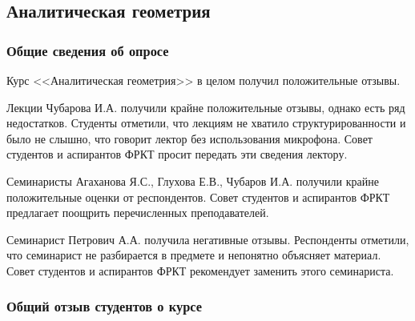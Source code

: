 \subsection{Аналитическая геометрия}
	
	\subsubsection{Общие сведения об опросе}

	    Курс <<Аналитическая геометрия>> в целом получил положительные отзывы.
        
        Лекции Чубарова И.А. получили крайне положительные отзывы, однако есть ряд недостатков. Студенты отметили, что лекциям не хватило структурированности и было не слышно, что говорит лектор без использования микрофона. Совет студентов и аспирантов ФРКТ просит передать эти сведения лектору.

        Семинаристы Агаханова Я.С., Глухова Е.В., Чубаров И.А. получили крайне положительные оценки от респондентов. Совет студентов и аспирантов ФРКТ предлагает поощрить перечисленных преподавателей.

        Семинарист Петрович А.А. получила негативные отзывы. Респонденты отметили, что семинарист не разбирается в предмете и непонятно объясняет материал. Совет студентов и аспирантов ФРКТ рекомендует заменить этого семинариста.

	\subsubsection{Общий отзыв студентов о курсе}

